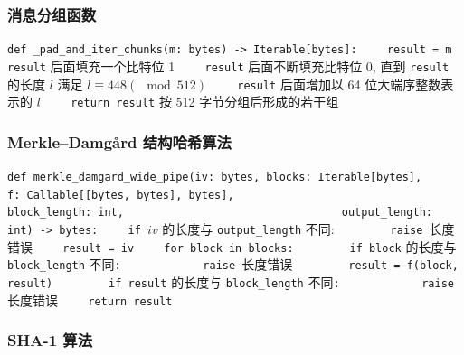 \documentclass[12pt,a4paper]{article}
\begin{document}
\subsubsection*{消息分组函数}

\lstinline{def _pad_and_iter_chunks(m: bytes) -> Iterable[bytes]:}
\newline
\lstinline{    result = m}
\newline
\lstinline{    result} 后面填充一个比特位 1
\newline
\lstinline{    result} 后面不断填充比特位 0, 直到 \lstinline{result} 的长度 $ l $ 满足 $ l \equiv 448 (\mod 512) $
\newline
\lstinline{    result} 后面增加以 64 位大端序整数表示的 $ l $
\newline
\lstinline{    return result} 按 512 字节分组后形成的若干组

\subsubsection*{Merkle–Damgård 结构哈希算法}

\lstinline{def merkle_damgard_wide_pipe(iv: bytes, blocks: Iterable[bytes], }
\newline
\lstinline{                                f: Callable[[bytes, bytes], bytes], }
\newline
\lstinline{                                block_length: int, }
\newline
\lstinline{                                output_length: int) -> bytes:}
\newline
\lstinline{    if }$ iv $ 的长度与 \lstinline{output_length} 不同:
\newline
\lstinline{        raise }长度错误
\newline
\lstinline{    result = iv}
\newline
\lstinline{    for block in blocks:}
\newline
\lstinline{        if block} 的长度与 \lstinline{block_length} 不同\lstinline{:}
\newline
\lstinline{            raise }长度错误
\newline
\lstinline{        result = f(block, result)}
\newline
\lstinline{        if result} 的长度与 \lstinline{block_length} 不同\lstinline{:}
\newline
\lstinline{            raise }长度错误
\newline
\lstinline{    return result}

\subsubsection*{SHA-1 算法}
\end{document}
